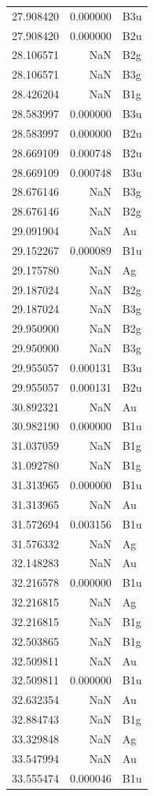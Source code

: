 \begin{longtable}{rrl}
27.908420 & 0.000000 & B3u \\
27.908420 & 0.000000 & B2u \\
28.106571 & NaN & B2g \\
28.106571 & NaN & B3g \\
28.426204 & NaN & B1g \\
28.583997 & 0.000000 & B3u \\
28.583997 & 0.000000 & B2u \\
28.669109 & 0.000748 & B2u \\
28.669109 & 0.000748 & B3u \\
28.676146 & NaN & B3g \\
28.676146 & NaN & B2g \\
29.091904 & NaN & Au \\
29.152267 & 0.000089 & B1u \\
29.175780 & NaN & Ag \\
29.187024 & NaN & B2g \\
29.187024 & NaN & B3g \\
29.950900 & NaN & B2g \\
29.950900 & NaN & B3g \\
29.955057 & 0.000131 & B3u \\
29.955057 & 0.000131 & B2u \\
30.892321 & NaN & Au \\
30.982190 & 0.000000 & B1u \\
31.037059 & NaN & B1g \\
31.092780 & NaN & B1g \\
31.313965 & 0.000000 & B1u \\
31.313965 & NaN & Au \\
31.572694 & 0.003156 & B1u \\
31.576332 & NaN & Ag \\
32.148283 & NaN & Au \\
32.216578 & 0.000000 & B1u \\
32.216815 & NaN & Ag \\
32.216815 & NaN & B1g \\
32.503865 & NaN & B1g \\
32.509811 & NaN & Au \\
32.509811 & 0.000000 & B1u \\
32.632354 & NaN & Au \\
32.884743 & NaN & B1g \\
33.329848 & NaN & Ag \\
33.547994 & NaN & Au \\
33.555474 & 0.000046 & B1u \\

\end{longtable}

